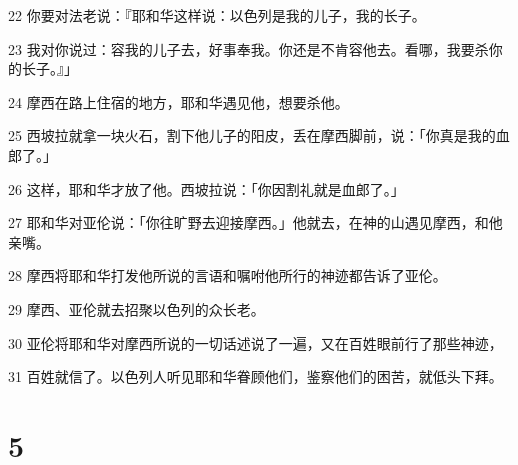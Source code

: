 \par 22 你要对法老说：『耶和华这样说：以色列是我的儿子，我的长子。
\par 23 我对你说过：容我的儿子去，好事奉我。你还是不肯容他去。看哪，我要杀你的长子。』」
\par 24 摩西在路上住宿的地方，耶和华遇见他，想要杀他。
\par 25 西坡拉就拿一块火石，割下他儿子的阳皮，丢在摩西脚前，说：「你真是我的血郎了。」
\par 26 这样，耶和华才放了他。西坡拉说：「你因割礼就是血郎了。」
\par 27 耶和华对亚伦说：「你往旷野去迎接摩西。」他就去，在神的山遇见摩西，和他亲嘴。
\par 28 摩西将耶和华打发他所说的言语和嘱咐他所行的神迹都告诉了亚伦。
\par 29 摩西、亚伦就去招聚以色列的众长老。
\par 30 亚伦将耶和华对摩西所说的一切话述说了一遍，又在百姓眼前行了那些神迹，
\par 31 百姓就信了。以色列人听见耶和华眷顾他们，鉴察他们的困苦，就低头下拜。

\chapter{5}

